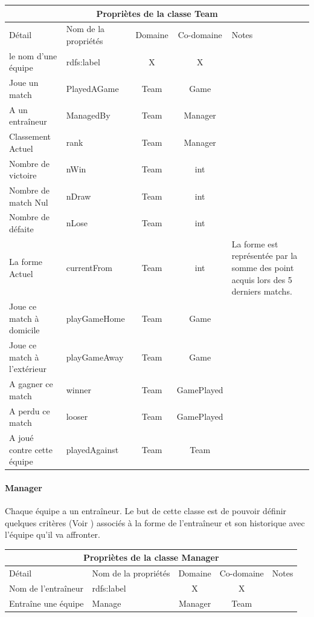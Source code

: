 \documentclass[oneside,13pt,a4paper]{article}
\begin{document}
\begin{tabular}{| l | l | c | c | p{3cm} |}
  \hline
  \multicolumn{5}{|c|}{Propriètes de la classe \textbf{Team}} \\ \hline
  Détail & Nom de la propriétés & Domaine & Co-domaine & Notes \\ \hline
  le nom d'une équipe & rdfs:label  & X & X &  \\ \hline
  Joue un match & PlayedAGame & Team & Game &  \\ \hline
  A un entraîneur & ManagedBy & Team  & Manager &  \\ \hline
  Classement Actuel & rank  & Team & Manager &  \\ \hline
  Nombre de victoire & nWin & Team & int &  \\ \hline
  Nombre de match Nul & nDraw & Team & int &  \\ \hline
  Nombre de défaite & nLose & Team & int &  \\ \hline
  La forme Actuel & currentFrom & Team & int & La forme est représentée par la somme des point acquis lors des 5 derniers matchs. \\ \hline
  Joue ce match à domicile & playGameHome & Team & Game & \\ \hline
  Joue ce match à l'extérieur & playGameAway & Team & Game & \\ \hline
  A gagner ce match & winner & Team & GamePlayed & \\ \hline
  A perdu ce match & looser & Team & GamePlayed & \\ \hline
  A joué contre cette équipe & playedAgainst & Team & Team & \\
  \hline
\end{tabular}

\paragraph{Manager}

Chaque équipe a un entraîneur. Le but de cette classe est de pouvoir définir quelques critères (Voir ) associés à la forme de l’entraîneur et son historique avec l’équipe qu’il va affronter.

\begin{tabular}{| l | l | c | c | p{3cm} |}
  \hline
  \multicolumn{5}{|c|}{Propriètes de la classe \textbf{Manager}} \\ \hline
  Détail & Nom de la propriétés & Domaine & Co-domaine & Notes \\ \hline
  Nom de l'entraîneur & rdfs:label & X  & X  &  \\ \hline
  Entraîne une équipe & Manage & Manager & Team &  \\
\hline
\end{tabular}
\end{document}
